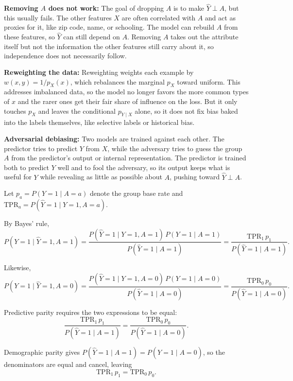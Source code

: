 \documentclass{cisXXX} %
\begin{document}
\HWsubproblem
\textbf{Removing $A$ does not work:} The goal of dropping $A$ is to make $\hat{Y} \perp A$, but this usually fails. The other features $X$ are often correlated with $A$ and act as proxies for it, like zip code, name, or schooling. The model can rebuild $A$ from these features, so $\hat{Y}$ can still depend on $A$. Removing $A$ takes out the attribute itself but not the information the other features still carry about it, so independence does not necessarily follow.

\HWsubproblem
\textbf{Reweighting the data:} Reweighting weights each example by $w(x,y) = 1/p_X(x)$, which rebalances the marginal $p_X$ toward uniform. This addresses imbalanced data, so the model no longer favors the more common types of $x$ and the rarer ones get their fair share of influence on the loss. But it only touches $p_X$ and leaves the conditional $p_{Y \mid X}$ alone, so it does not fix bias baked into the labels themselves, like selective labels or historical bias.

\HWsubproblem
\textbf{Adversarial debiasing:} Two models are trained against each other. The predictor tries to predict $Y$ from $X$, while the adversary tries to guess the group $A$ from the predictor's output or internal representation. The predictor is trained both to predict $Y$ well and to fool the adversary, so its output keeps what is useful for $Y$ while revealing as little as possible about $A$, pushing toward $\hat{Y} \perp A$.

\HWproblem
Let $p_a = P(Y=1 \mid A=a)$ denote the group base rate and $\mathrm{TPR}_a = P(\hat{Y}=1 \mid Y=1, A=a)$.

\HWsubproblem
By Bayes' rule,
$$P(Y=1 \mid \hat{Y}=1, A=1) = \frac{P(\hat{Y}=1 \mid Y=1, A=1)\,P(Y=1 \mid A=1)}{P(\hat{Y}=1 \mid A=1)} = \frac{\mathrm{TPR}_1 \, p_1}{P(\hat{Y}=1 \mid A=1)}.$$

\HWsubproblem
Likewise,
$$P(Y=1 \mid \hat{Y}=1, A=0) = \frac{P(\hat{Y}=1 \mid Y=1, A=0)\,P(Y=1 \mid A=0)}{P(\hat{Y}=1 \mid A=0)} = \frac{\mathrm{TPR}_0 \, p_0}{P(\hat{Y}=1 \mid A=0)}.$$

\HWsubproblem
Predictive parity requires the two expressions to be equal:
$$\frac{\mathrm{TPR}_1 \, p_1}{P(\hat{Y}=1 \mid A=1)} = \frac{\mathrm{TPR}_0 \, p_0}{P(\hat{Y}=1 \mid A=0)}.$$

\HWsubproblem
Demographic parity gives $P(\hat{Y}=1 \mid A=1) = P(\hat{Y}=1 \mid A=0)$, so the denominators are equal and cancel, leaving
$$\mathrm{TPR}_1 \, p_1 = \mathrm{TPR}_0 \, p_0.$$
\end{document}
